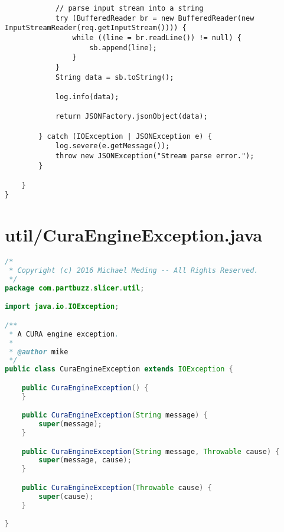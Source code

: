 \begin{lstlisting}
            // parse input stream into a string
            try (BufferedReader br = new BufferedReader(new InputStreamReader(req.getInputStream()))) {
                while ((line = br.readLine()) != null) {
                    sb.append(line);
                }
            }
            String data = sb.toString();

            log.info(data);

            return JSONFactory.jsonObject(data);

        } catch (IOException | JSONException e) {
            log.severe(e.getMessage());
            throw new JSONException("Stream parse error.");
        }

    }
}
\end{lstlisting}


\section{util/CuraEngineException.java}
\begin{lstlisting}[language=Java, label={lst:CuraEngineException}, caption=This exception class gets thrown when any issue arises while CuraEngine is preforming a slice.]
/*
 * Copyright (c) 2016 Michael Meding -- All Rights Reserved.
 */
package com.partbuzz.slicer.util;

import java.io.IOException;

/**
 * A CURA engine exception.
 *
 * @author mike
 */
public class CuraEngineException extends IOException {

	public CuraEngineException() {
	}

	public CuraEngineException(String message) {
		super(message);
	}

	public CuraEngineException(String message, Throwable cause) {
		super(message, cause);
	}

	public CuraEngineException(Throwable cause) {
		super(cause);
	}

}
\end{lstlisting}

